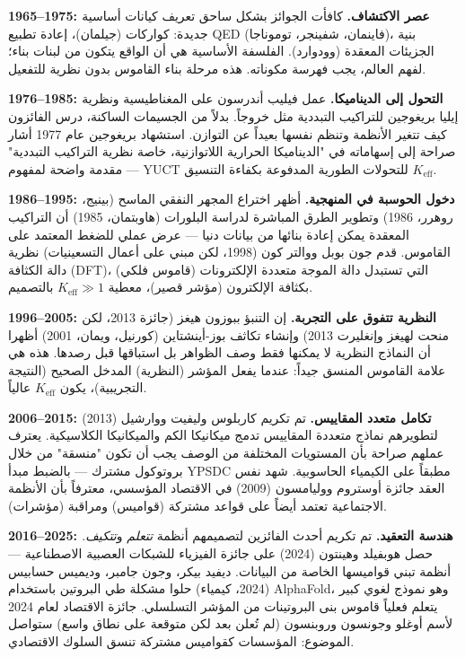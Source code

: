 \documentclass[12pt,a4paper]{article}
\begin{document}
	\textbf{1965–1975: عصر الاكتشاف.} كافأت الجوائز بشكل ساحق تعريف كيانات أساسية جديدة: كواركات (جيلمان)، إعادة تطبيع QED (فاينمان، شفينجر، توموناجا)، بنية الجزيئات المعقدة (وودوارد). الفلسفة الأساسية هي أن الواقع يتكون من لبنات بناء؛ لفهم العالم، يجب فهرسة مكوناته. هذه مرحلة بناء القاموس بدون نظرية للتفعيل.
	
	\textbf{1976–1985: التحول إلى الديناميكا.} عمل فيليب أندرسون على المغناطيسية ونظرية إيليا بريغوجين للتراكيب التبددية مثل خروجاً. بدلاً من الجسيمات الساكنة، درس الفائزون كيف تتغير الأنظمة وتنظم نفسها بعيداً عن التوازن. استشهاد بريغوجين عام 1977 أشار صراحة إلى إسهاماته في "الديناميكا الحرارية اللاتوازنية، خاصة نظرية التراكيب التبددية" — مقدمة واضحة لمفهوم YUCT للتحولات الطورية المدفوعة بكفاءة التنسيق \(K_{\mathrm{eff}}\).
	
	\textbf{1986–1995: دخول الحوسبة في المنهجية.} أظهر اختراع المجهر النفقي الماسح (بينيج، روهرر، 1986) وتطوير الطرق المباشرة لدراسة البلورات (هاوبتمان، 1985) أن التراكيب المعقدة يمكن إعادة بنائها من بيانات دنيا — عرض عملي للضغط المعتمد على القاموس. قدم جون بوبل ووالتر كون (1998، لكن مبني على أعمال التسعينيات) نظرية دالة الكثافة (DFT)، التي تستبدل دالة الموجة متعددة الإلكترونات (قاموس فلكي) بكثافة الإلكترون (مؤشر قصير)، معطية \(K_{\mathrm{eff}} \gg 1\) بالتصميم.
	
	\textbf{1996–2005: النظرية تتفوق على التجربة.} إن التنبؤ ببوزون هيغز (جائزة 2013، لكن منحت لهيغز وإنغليرت 2013) وإنشاء تكاثف بوز-أينشتاين (كورنيل، ويمان، 2001) أظهرا أن النماذج النظرية لا يمكنها فقط وصف الظواهر بل استباقها قبل رصدها. هذه هي علامة القاموس المنسق جيداً: عندما يفعل المؤشر (النظرية) المدخل الصحيح (النتيجة التجريبية)، يكون \(K_{\mathrm{eff}}\) عالياً.
	
	\textbf{2006–2015: تكامل متعدد المقاييس.} تم تكريم كاربلوس وليفيت ووارشيل (2013) لتطويرهم نماذج متعددة المقاييس تدمج ميكانيكا الكم والميكانيكا الكلاسيكية. يعترف عملهم صراحة بأن المستويات المختلفة من الوصف يجب أن تكون "منسقة" من خلال بروتوكول مشترك — بالضبط مبدأ YPSDC مطبقاً على الكيمياء الحاسوبية. شهد نفس العقد جائزة أوستروم ووليامسون (2009) في الاقتصاد المؤسسي، معترفاً بأن الأنظمة الاجتماعية تعتمد أيضاً على قواعد مشتركة (قواميس) ومراقبة (مؤشرات).
	
	\textbf{2016–2025: هندسة التعقيد.} تم تكريم أحدث الفائزين لتصميمهم أنظمة \emph{تتعلم} و\emph{تتكيف}. حصل هوبفيلد وهينتون (2024) على جائزة الفيزياء للشبكات العصبية الاصطناعية — أنظمة تبني قواميسها الخاصة من البيانات. ديفيد بيكر، وجون جامبر، وديميس حسابيس (2024، كيمياء) حلوا مشكلة طي البروتين باستخدام AlphaFold، وهو نموذج لغوي كبير يتعلم فعلياً قاموس بنى البروتينات من المؤشر التسلسلي. جائزة الاقتصاد لعام 2024 لأسم أوغلو وجونسون وروبنسون (لم تُعلن بعد لكن متوقعة على نطاق واسع) ستواصل الموضوع: المؤسسات كقواميس مشتركة تنسق السلوك الاقتصادي.
	
\end{document}
